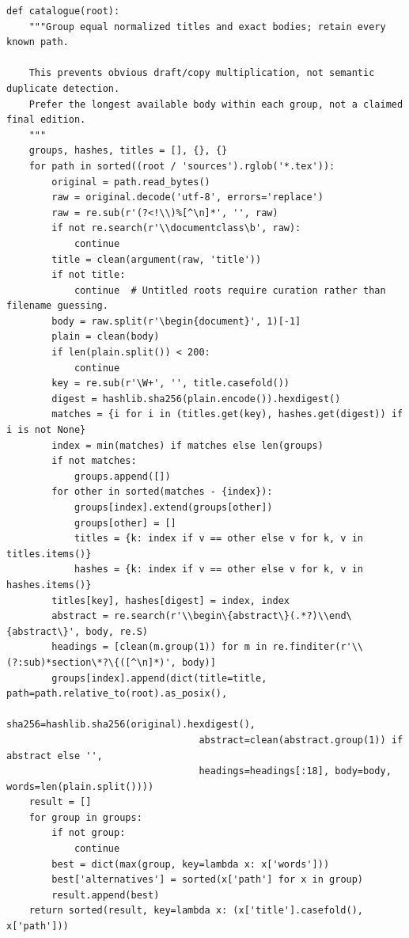 \documentclass[11pt]{article}
\begin{document}
\begin{lstlisting}
def catalogue(root):
    """Group equal normalized titles and exact bodies; retain every known path.

    This prevents obvious draft/copy multiplication, not semantic duplicate detection.
    Prefer the longest available body within each group, not a claimed final edition.
    """
    groups, hashes, titles = [], {}, {}
    for path in sorted((root / 'sources').rglob('*.tex')):
        original = path.read_bytes()
        raw = original.decode('utf-8', errors='replace')
        raw = re.sub(r'(?<!\\)%[^\n]*', '', raw)
        if not re.search(r'\\documentclass\b', raw):
            continue
        title = clean(argument(raw, 'title'))
        if not title:
            continue  # Untitled roots require curation rather than filename guessing.
        body = raw.split(r'\begin{document}', 1)[-1]
        plain = clean(body)
        if len(plain.split()) < 200:
            continue
        key = re.sub(r'\W+', '', title.casefold())
        digest = hashlib.sha256(plain.encode()).hexdigest()
        matches = {i for i in (titles.get(key), hashes.get(digest)) if i is not None}
        index = min(matches) if matches else len(groups)
        if not matches:
            groups.append([])
        for other in sorted(matches - {index}):
            groups[index].extend(groups[other])
            groups[other] = []
            titles = {k: index if v == other else v for k, v in titles.items()}
            hashes = {k: index if v == other else v for k, v in hashes.items()}
        titles[key], hashes[digest] = index, index
        abstract = re.search(r'\\begin\{abstract\}(.*?)\\end\{abstract\}', body, re.S)
        headings = [clean(m.group(1)) for m in re.finditer(r'\\(?:sub)*section\*?\{([^\n]*)', body)]
        groups[index].append(dict(title=title, path=path.relative_to(root).as_posix(),
                                  sha256=hashlib.sha256(original).hexdigest(),
                                  abstract=clean(abstract.group(1)) if abstract else '',
                                  headings=headings[:18], body=body, words=len(plain.split())))
    result = []
    for group in groups:
        if not group:
            continue
        best = dict(max(group, key=lambda x: x['words']))
        best['alternatives'] = sorted(x['path'] for x in group)
        result.append(best)
    return sorted(result, key=lambda x: (x['title'].casefold(), x['path']))



\end{lstlisting}
\end{document}
